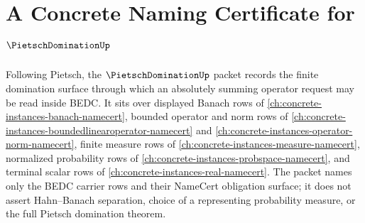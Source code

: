 \chapter{A Concrete Naming Certificate for $\PietschDominationUp$}
\label{ch:concrete-instances-pietsch-domination-namecert}

Following Pietsch, the $\PietschDominationUp$ packet records the finite domination surface through which an absolutely summing operator request may be read inside BEDC. It sits over displayed Banach rows of \autoref{ch:concrete-instances-banach-namecert}, bounded operator and norm rows of \autoref{ch:concrete-instances-boundedlinearoperator-namecert} and \autoref{ch:concrete-instances-operator-norm-namecert}, finite measure rows of \autoref{ch:concrete-instances-measure-namecert}, normalized probability rows of \autoref{ch:concrete-instances-probspace-namecert}, and terminal scalar rows of \autoref{ch:concrete-instances-real-namecert}. The packet names only the BEDC carrier rows and their NameCert obligation surface; it does not assert Hahn--Banach separation, choice of a representing probability measure, or the full Pietsch domination theorem.

